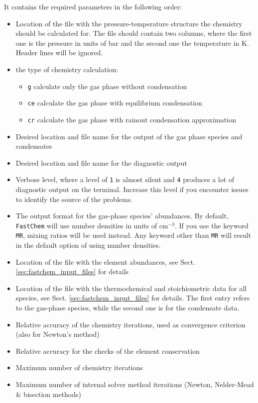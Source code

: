 \documentclass[numbers=noenddot]{aux/fcmanual}
\newcommand{\fc}{\texttt{FastChem}\xspace}
\begin{document}
It contains the required parameters in the following order:
\begin{itemize}
  \item Location of the file with the pressure-temperature structure the chemistry should be calculated for. The file should contain two columns, where the first one is the pressure in units of bar and the second one the temperature in K. Header lines will be ignored.
  \item the type of chemistry calculation:
    \begin{itemize}
    	\item \verb|g| calculate only the gas phase without condensation
    	\item \verb|ce| calculate the gas phase with equilibrium condensation
        \item \verb|cr| calculate the gas phase with rainout condensation approximation
    \end{itemize}
  \item Desired location and file name for the output of the gas phase species and condensates
  \item Desired location and file name for the diagnostic output
  \item Verbose level, where a level of \verb|1| is almost silent and \verb|4| produces a lot of diagnostic output on the terminal. Increase this level if you encounter issues to identify the source of the problems.
  \item The output format for the gas-phase species' abundances. By default, \fc will use number densities in units of cm$^{-3}$. If you use the keyword \verb|MR|, mixing ratios will be used instead. Any keyword other than \verb|MR| will result in the default option of using number densities.
  \item Location of the file with the element abundances, see Sect. \ref{sec:fastchem_input_files} for details
  \item Location of the file with the thermochemical and stoichiometric data for all species, see Sect. \ref{sec:fastchem_input_files} for details. The first entry refers to the gas-phase species, while the second one is for the condensate data. 
  \item Relative accuracy of the chemistry iterations, used as convergence criterion (also for Newton's method)
  \item Relative accuracy for the checks of the element conservation
  \item Maximum number of chemistry iterations
  \item Maximum number of internal solver method iterations (Newton, Nelder-Mead \& bisection methods)
\end{itemize}
\end{document}
